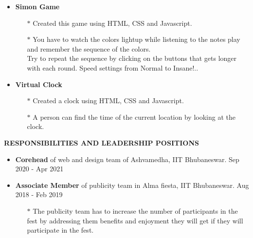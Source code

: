 \documentclass{article}
\begin{document}
{{{{{{{\begin{itemize}
\item   {\bf Simon Game}
\vspace{-2mm}
\begin{itemize}
  \vspace{0.5mm}
  \item[$\ast$] Created this game using HTML, CSS and Javascript.
  \vspace{-0.5mm}
  \item[$\ast$]  You have to watch the colors lightup while listening to the notes play and remember the sequence of the colors.\\ 
 Try to repeat the sequence by clicking on the buttons that gets longer with each round. Speed settings from Normal to Insane!..
\end{itemize}

\item   {\bf Virtual Clock}
\vspace{-2mm}
\begin{itemize}
  \vspace{0.5mm}
  \item[$\ast$] Created a clock using HTML, CSS and Javascript.
  \vspace{-0.5mm}
  \item[$\ast$]A person can find the time of the current location by looking at the clock.
\end{itemize}

\end{itemize}




\vspace{4mm}

{\medskip
\large { {\bf  \color[rgb]{0,0,1} RESPONSIBILITIES AND LEADERSHIP POSITIONS}} \hrulefill \par
\normalsize

\begin{itemize}

\item    {\bf Corehead} of web and design team of Ashvamedha, IIT Bhubaneswar. {\hfill Sep 2020 - Apr 2021} 

\item    {\bf Associate Member} of publicity team in Alma fiesta, IIT Bhubaneswar.    			{\hfill Aug 2018 - Feb 2019}
\vspace{-2mm}
\begin{itemize}
  \vspace{0.5mm}
  \item[$\ast$] The publicity team has to increase the number of participants in the fest by addressing them benefits and enjoyment they will get if they will participate in the fest.
  \vspace{-0.5mm}
\end{itemize}



\end{itemize}}}}}}}}}
\end{document}

